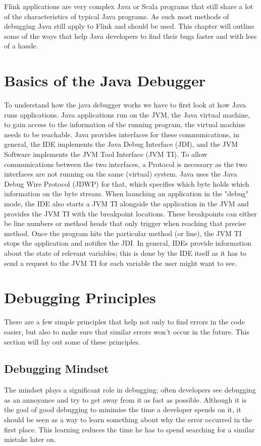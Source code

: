 Flink applications are very complex Java or Scala programs that still share a lot of the characteristics of typical Java programs. As such most methods of debugging Java still apply to Flink and should be used. This chapter will outline some of the ways that help Java developers to find their bugs faster and with less of a hassle.

\section{Basics of the Java Debugger}

To understand how the java debugger works we have to first look at how Java runs applications. Java applications run on the JVM, the Java virtual machine, to gain access to the information of the running program, the virtual machine needs to be reachable. Java provides interfaces for these communications, in general, the IDE implements the Java Debug Interface (JDI), and the JVM Software implements the JVM Tool Interface (JVM TI). To allow communications between the two interfaces, a Protocol is necessary as the two interfaces are not running on the same (virtual) system. Java uses the Java Debug Wire Protocol (JDWP) for that, which specifies which byte holds which information on the byte stream. When launching an application in the "debug" mode, the IDE also starts a JVM TI alongside the application in the JVM and provides the JVM TI with the breakpoint locations. These breakpoints can either be line numbers or method heads that only trigger when reaching that precise method. Once the program hits the particular method (or line), the JVM TI stops the application and notifies the JDI. In general, IDEs provide information about the state of relevant variables; this is done by the IDE itself as it has to send a request to the JVM TI for each variable the user might want to see.

\section{Debugging Principles}

There are a few simple principles that help not only to find errors in the code easier, but also to make sure that similar errors won't occur in the future. This section will lay out some of these principles.

\subsection{Debugging Mindset}
The mindset plays a significant role in debugging; often developers see debugging as an annoyance and try to get away from it as fast as possible. Although it is the goal of good debugging to minimise the time a developer spends on it, it should be seen as a way to learn something about why the error occurred in the first place. This learning reduces the time he has to spend searching for a similar mistake later on.

